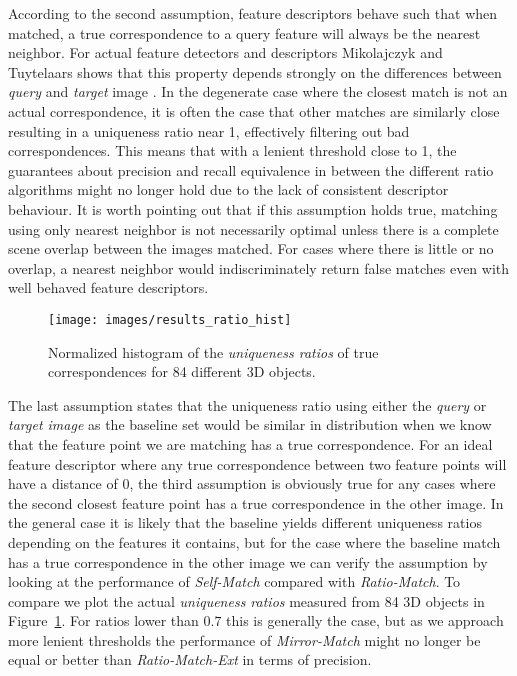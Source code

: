 \documentclass[journal]{IEEEtran}
\begin{document}
According to the second assumption, feature descriptors behave such that
when matched, a true correspondence to a query feature will always be 
the nearest neighbor. For actual feature detectors and descriptors 
Mikolajczyk and Tuytelaars shows that this property depends strongly on 
the differences between \emph{query} and \emph{target} image 
\cite{mikolajczyk2005performance} \cite{tuytelaars2008local}. In the 
degenerate case where the closest match is not an actual correspondence, 
it is often the case that other matches are similarly close resulting in 
a uniqueness ratio near 1, effectively filtering out bad 
correspondences.  This means that with a lenient threshold close to 1, 
the guarantees about precision and recall equivalence in between the 
different ratio algorithms might no longer hold due to the lack of 
consistent descriptor behaviour. It is worth pointing out that if this 
assumption holds true, matching using only nearest neighbor is not 
necessarily optimal unless there is a complete scene overlap between
the images matched. For cases where there is little or no overlap, a 
nearest neighbor would indiscriminately return false matches even with 
well behaved feature descriptors.

\begin{figure}[t]
\centering
\texttt{[image: images/results\_ratio\_hist]}
\caption{Normalized histogram of the \emph{uniqueness ratios} of true 
correspondences for 84 different 3D objects.}
\label{fig:ratio_hist}
\end{figure}

The last assumption states that the uniqueness ratio using either the 
\emph{query} or \emph{target image} as the baseline set would be similar
in distribution when we know that the feature point we are matching has 
a true correspondence. For an ideal feature descriptor where any true 
correspondence between two feature points will have a distance of $0$, 
the third assumption is obviously true for any cases where the second 
closest feature point has a true correspondence in the other image. In 
the general case it is likely that the baseline yields different 
uniqueness ratios depending on the features it contains, but for the 
case where the baseline match has a true correspondence in the other 
image we can verify the assumption by looking at the performance of 
\emph{Self-Match} compared with \emph{Ratio-Match}. To compare we plot 
the actual \emph{uniqueness ratios} measured from 84 3D objects in 
Figure~\ref{fig:ratio_hist}. For ratios lower than $0.7$ this is 
generally the case, but as we approach more lenient thresholds the 
performance of \emph{Mirror-Match} might no longer be equal or better 
than \emph{Ratio-Match-Ext} in terms of precision.
\end{document}
